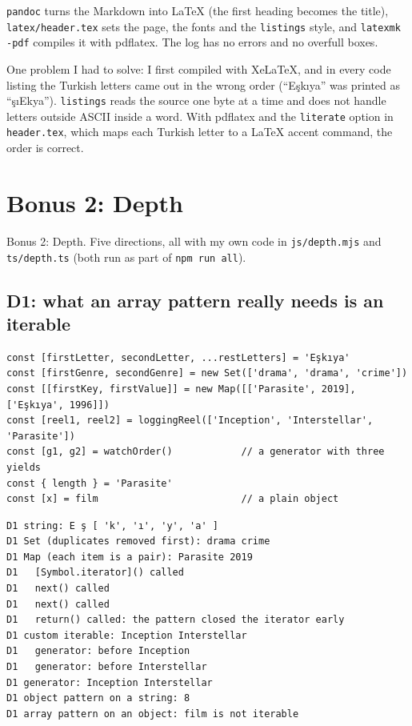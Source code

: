 \documentclass[
]{article}
\newcommand{\passthrough}[1]{#1}
\begin{document}
\passthrough{\lstinline!pandoc!} turns the Markdown into LaTeX (the
first heading becomes the title),
\passthrough{\lstinline!latex/header.tex!} sets the page, the fonts and
the \passthrough{\lstinline!listings!} style, and
\passthrough{\lstinline!latexmk -pdf!} compiles it with pdflatex. The
log has no errors and no overfull boxes.

One problem I had to solve: I first compiled with XeLaTeX, and in every
code listing the Turkish letters came out in the wrong order (``Eşkıya''
was printed as ``şıEkya''). \passthrough{\lstinline!listings!} reads the
source one byte at a time and does not handle letters outside ASCII
inside a word. With pdflatex and the \passthrough{\lstinline!literate!}
option in \passthrough{\lstinline!header.tex!}, which maps each Turkish
letter to a LaTeX accent command, the order is correct.

\hypertarget{bonus-2-depth}{%
\section{Bonus 2: Depth}\label{bonus-2-depth}}

Bonus 2: Depth. Five directions, all with my own code in
\passthrough{\lstinline!js/depth.mjs!} and
\passthrough{\lstinline!ts/depth.ts!} (both run as part of
\passthrough{\lstinline!npm run all!}).

\hypertarget{d1-what-an-array-pattern-really-needs-is-an-iterable}{%
\subsection{D1: what an array pattern really needs is an
iterable}\label{d1-what-an-array-pattern-really-needs-is-an-iterable}}

\begin{lstlisting}
const [firstLetter, secondLetter, ...restLetters] = 'Eşkıya'
const [firstGenre, secondGenre] = new Set(['drama', 'drama', 'crime'])
const [[firstKey, firstValue]] = new Map([['Parasite', 2019], ['Eşkıya', 1996]])
const [reel1, reel2] = loggingReel(['Inception', 'Interstellar', 'Parasite'])
const [g1, g2] = watchOrder()            // a generator with three yields
const { length } = 'Parasite'
const [x] = film                         // a plain object
\end{lstlisting}

\begin{lstlisting}
D1 string: E ş [ 'k', 'ı', 'y', 'a' ]
D1 Set (duplicates removed first): drama crime
D1 Map (each item is a pair): Parasite 2019
D1   [Symbol.iterator]() called
D1   next() called
D1   next() called
D1   return() called: the pattern closed the iterator early
D1 custom iterable: Inception Interstellar
D1   generator: before Inception
D1   generator: before Interstellar
D1 generator: Inception Interstellar
D1 object pattern on a string: 8
D1 array pattern on an object: film is not iterable
\end{lstlisting}
\end{document}

